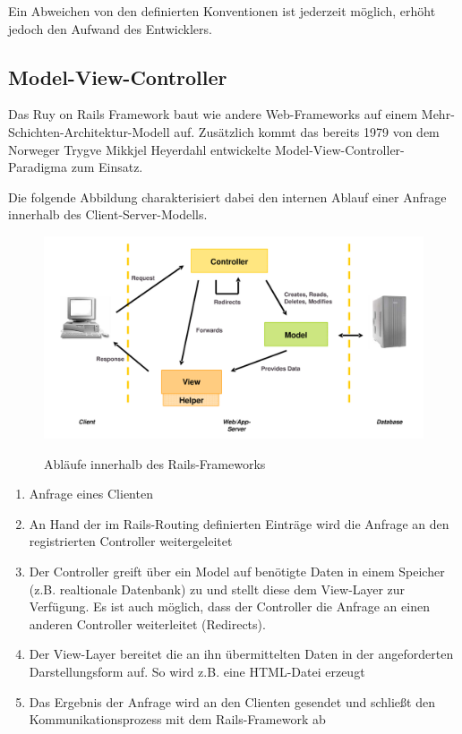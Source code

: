 Ein Abweichen von den definierten Konventionen ist jederzeit möglich, erhöht jedoch den Aufwand des Entwicklers.

\subsection{Model-View-Controller}
Das Ruy on Rails Framework baut wie andere Web-Frameworks auf einem Mehr-Schichten-Architektur-Modell auf. Zusätzlich kommt das bereits 1979 von dem Norweger Trygve Mikkjel Heyerdahl entwickelte Model-View-Controller-Paradigma zum Einsatz.

Die folgende Abbildung charakterisiert dabei den internen Ablauf einer Anfrage innerhalb des Client-Server-Modells.

\begin{figure}[!h]
\begin{center}
\label{sec.mvc}
\includegraphics[scale=0.4]{images/analyse/mvc.png}
\caption{Abläufe innerhalb des Rails-Frameworks}
\end{center}
\end{figure}

\begin{enumerate}
\item
Anfrage eines Clienten
\item
An Hand der im Rails-Routing definierten Einträge wird die Anfrage an den registrierten Controller weitergeleitet
\item
Der Controller greift über ein Model auf benötigte Daten in einem Speicher (z.B. realtionale Datenbank) zu und stellt diese dem View-Layer zur Verfügung. Es ist auch möglich, dass der Controller die Anfrage an einen anderen Controller weiterleitet (Redirects).
\item
Der View-Layer bereitet die an ihn übermittelten Daten in der angeforderten Darstellungsform auf. So wird z.B. eine HTML-Datei erzeugt
\item
Das Ergebnis der Anfrage wird an den Clienten gesendet und schließt den Kommunikationsprozess mit dem Rails-Framework ab

\end{enumerate}



